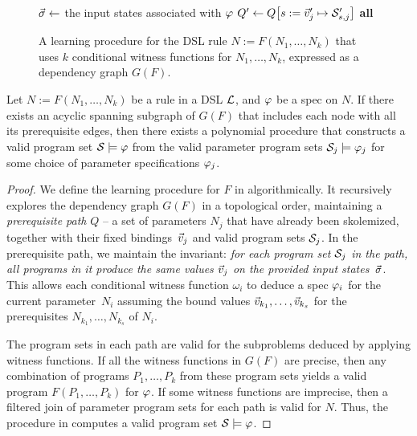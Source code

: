\begin{figure}[p!]
\begin{fullpage}
\begin{algorithmic}[1]
            \State \Return {}
            \Statex {}
            \Else
            \State $\vec{\sigma} \gets$ the input states associated with $\varphi$
             \label{alg:line:clusters}
            \State $Q' \gets Q\bigl[s := \vec{v}'_j \mapsto \mathcal{S}'_{s,j}\bigr]$
            \State \Yield \textbf{all} 
            \EndFor
            \EndIf
            \EndFunction
        \end{algorithmic}
        \caption{A learning procedure for the DSL rule $N := F(N_1, \dots, N_k)$ that uses $k$ conditional witness functions
        for $N_1, \dots, N_k$, expressed as a dependency graph $G(F)$.}
        \label{fig:prose:algorithm}
    \end{fullpage}
\end{figure}

\begin{theorem}
    Let $N := F(N_1, \dots, N_k)$ be a rule in a DSL $\mathcal{L}$, and $\varphi$ be a spec on $N$.
    If there exists an acyclic spanning subgraph of $G(F)$ that includes each node with all its prerequisite edges, then
    there exists a polynomial procedure that constructs a valid program set $\mathcal{S} \models \varphi$ from the valid
    parameter program sets $\mathcal{S}_j \models \varphi_j$ for some choice of parameter specifications $\varphi_j$.
    \label{thm:wf:cond}
\end{theorem}
\begin{proof}
    We define the learning procedure for $F$ in  algorithmically.
    It recursively explores the dependency graph $G(F)$ in a topological order, maintaining a \emph{prerequisite path}
    $Q$ -- a set of
    parameters $N_j$ that have already been skolemized, together with their fixed bindings~$\vec{v}_j$ and valid program
    sets $\mathcal{S}_j$.
    In the prerequisite path, we maintain the invariant: \emph{for each program set $\mathcal{S}_j$ in the path, all programs
        in it produce the same values $\vec{v}_j$ on the provided input states~$\vec{\sigma}$}.
    This allows each conditional witness function $\omega_{i}$ to deduce a spec $\varphi_i$ for the current
    parameter~$N_i$ assuming the bound values $\vec{v}_{k_1}, \dots, \vec{v}_{k_s}$ for the prerequisites
    $N_{k_1}, \dots, N_{k_s}$ of $N_i$.

    The program sets in each path are valid for the subproblems deduced by applying witness functions.
    If all the witness functions in $G(F)$ are precise, then any combination of programs $P_1, \dots, P_k$ from these
    program sets yields a valid program $F(P_1, \dots, P_k)$ for $\varphi$.
    If some witness functions are imprecise, then a filtered join of parameter program sets for each path is valid
    for $N$.
    Thus, the procedure in  computes a valid program set $\mathcal{S} \models \varphi$.
\end{proof}

